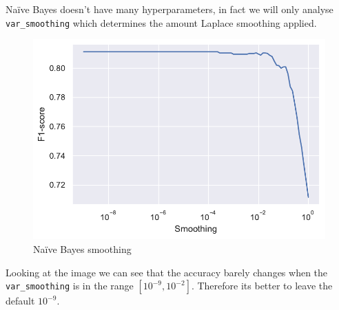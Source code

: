 Na\"ive Bayes doesn't have many hyperparameters, in fact we will only analyse \texttt{var\_smoothing} which determines the amount Laplace smoothing applied.

\begin{figure}[H]
    \centering
    \includegraphics{figures/naive_bayes_smoothing_cv.pdf}
    \caption{Na\"ive Bayes smoothing}%
    \label{fig:naive_bayes_smoothing_cv}
\end{figure}

Looking at the image we can see that the accuracy barely changes when the \texttt{var\_smoothing} is in the range $[10^{-9}, 10^{-2}]$. Therefore its better to leave the default $10^{-9}$.
